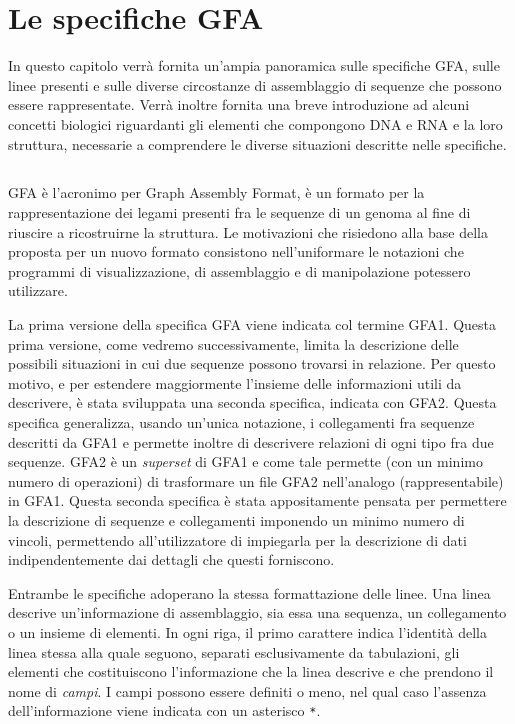\chapter{Le specifiche GFA}

In questo capitolo verrà fornita un'ampia panoramica sulle specifiche
GFA, sulle linee presenti e sulle diverse circostanze di assemblaggio
di sequenze che possono essere rappresentate.
Verrà inoltre fornita una breve introduzione ad alcuni concetti
biologici riguardanti gli elementi che compongono DNA e RNA e
la loro struttura, necessarie a comprendere le diverse situazioni
descritte nelle specifiche.

\section*{}
GFA è l'acronimo per Graph Assembly Format, è un
formato per la rappresentazione dei legami presenti fra le sequenze di
un genoma al fine di riuscire a ricostruirne la struttura.
Le motivazioni che risiedono alla base della proposta per un nuovo
formato consistono nell'uniformare le notazioni che programmi
di visualizzazione, di assemblaggio e di manipolazione potessero
utilizzare.

La prima versione della specifica GFA viene indicata col termine
GFA1. Questa prima versione, come vedremo successivamente,
limita la descrizione delle possibili situazioni in cui due sequenze
possono trovarsi in relazione. Per questo motivo, e per estendere
maggiormente l'insieme delle informazioni utili da descrivere,
è stata sviluppata una seconda specifica, indicata con GFA2.
Questa specifica generalizza, usando un'unica notazione,
i collegamenti fra sequenze descritti da GFA1 e permette inoltre
di descrivere relazioni di ogni tipo fra due sequenze.
GFA2 è un \emph{superset} di GFA1 e come tale permette
(con un minimo numero di operazioni) di trasformare un file GFA2
nell'analogo (rappresentabile) in GFA1. Questa seconda specifica
è stata appositamente pensata per permettere la descrizione di
sequenze e collegamenti imponendo un minimo numero di vincoli,
permettendo all'utilizzatore di impiegarla per la descrizione di dati
indipendentemente dai dettagli che questi forniscono.

Entrambe le specifiche adoperano la stessa formattazione delle linee.
Una linea descrive un'informazione di assemblaggio, sia
essa una sequenza, un collegamento o un insieme di elementi.
In ogni riga, il primo carattere indica
l'identità della linea stessa alla quale seguono, separati esclusivamente
da tabulazioni, gli elementi che costituiscono l'informazione
che la linea descrive e che prendono il nome di \emph{campi}.
I campi possono essere definiti o meno, nel qual caso l'assenza
dell'informazione viene indicata con un asterisco \texttt{*}.

